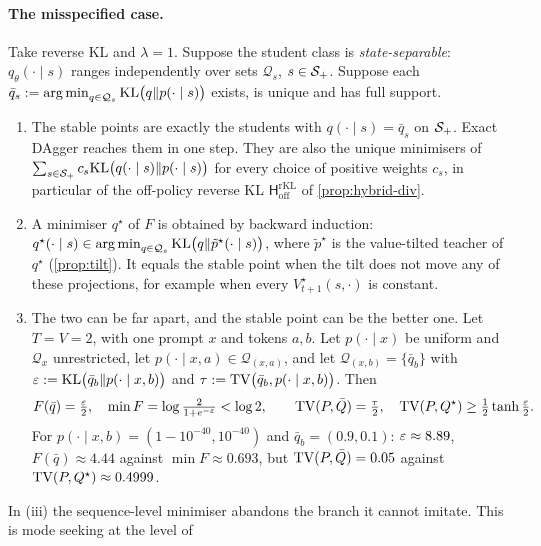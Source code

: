 \paragraph{The misspecified case.}

\begin{proposition}\label{prop:separable}
\Pv\Ck Take reverse KL and $\lambda=1$. Suppose the student class is \emph{state-separable}: $q_\theta(\cdot\mid s)$ ranges independently over
sets $\mathcal Q_s$, $s\in\mathcal{S}_+$. Suppose each $\bar q_s:=\operatorname*{arg\,min}_{q\in\mathcal Q_s}\mathrm{KL}\big(q\|p(\cdot\mid s)\big)$ exists, is unique and has full support.
\begin{enumerate}[label=(\roman*),nosep]
\item The stable points are exactly the students with $q(\cdot\mid s)=\bar q_s$ on $\mathcal{S}_+$. Exact DAgger reaches them in one step. They
are also the unique minimisers of $\sum_{s\in\mathcal{S}_+}c_s\mathrm{KL}\big(q(\cdot\mid s)\|p(\cdot\mid s)\big)$ for every choice of positive weights $c_s$, in particular
of the off-policy reverse KL $\mathsf H^{\mathrm{rKL}}_{\mathrm{off}}$ of \cref{prop:hybrid-div}.
\item A minimiser $q^\star$ of $F$ is obtained by backward induction: $q^\star(\cdot\mid s)\in\operatorname*{arg\,min}_{q\in\mathcal Q_s}\mathrm{KL}\big(q\|\tilde p^{\star}(\cdot\mid s)\big)$, where $\tilde p^\star$ is
the value-tilted teacher of $q^\star$ (\cref{prop:tilt}). It equals the stable point when the tilt does not move any of these
projections, for example when every $V^\star_{t+1}(s,\cdot)$ is constant.
\item The two can be far apart, and the stable point can be the better one. Let $T=V=2$, with one prompt $x$ and
tokens $a,b$. Let $p(\cdot\mid x)$ be uniform and $\mathcal Q_x$ unrestricted, let $p(\cdot\mid x,a)\in\mathcal Q_{(x,a)}$, and let $\mathcal Q_{(x,b)}=\{\bar q_b\}$ with
$\varepsilon:=\mathrm{KL}\big(\bar q_b\|p(\cdot\mid x,b)\big)$ and $\tau:=\mathrm{TV}\big(\bar q_b,p(\cdot\mid x,b)\big)$. Then
\[
F(\bar q)=\tfrac{\varepsilon}2,\quad \min F=\log\tfrac{2}{1+e^{-\varepsilon}}<\log 2,\qquad
\mathrm{TV}(P,\bar Q)=\tfrac\tau2,\quad \mathrm{TV}(P,Q^\star)\ge\tfrac12\tanh\tfrac{\varepsilon}2 .
\]
For $p(\cdot\mid x,b)=(1-10^{-40},10^{-40})$ and $\bar q_b=(0.9,0.1)$: $\varepsilon\approx8.89$, $F(\bar q)\approx4.44$ against $\min F\approx0.693$, but
$\mathrm{TV}(P,\bar Q)=0.05$ against $\mathrm{TV}(P,Q^\star)\approx0.4999$.
\end{enumerate}
\end{proposition}
\noindent
In (iii) the sequence-level minimiser abandons the branch it cannot imitate. This is mode seeking at the level of
